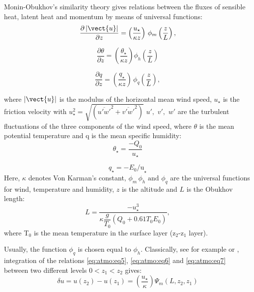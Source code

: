 Monin-Obukhov's similarity theory gives relations between the fluxes of
sensible heat, latent heat and momentum by means of universal functions:
\begin{equation}
\label{eq:atmo:eq5}
\frac{\partial \left| {\vect{u}} \right|}{\partial z} =
\left( {\frac{{u}_{{\star }} }{\kappa z}} \right) \, \phi_{m} \left(
{\dfrac{z}{L}} \right),
\end{equation}

\begin{equation}
\label{eq:atmo:eq6}
\frac{\partial {\theta }}{\partial z}=\left( {\frac{\theta_{\star}}{\kappa z}} \right)\phi_{h} \left({\frac{z}{L}} \right)
\end{equation}

\begin{equation}
\label{eq:atmo:eq7}
\frac{\partial q}{\partial z}=\left(
{\frac{q_{\star} }{\kappa z}} \right) \,
\phi_{q} \left(
{\frac{z}{L}} \right),
\end{equation}


where $\left| {\vect{u}} \right|$ is the modulus of the horizontal mean wind speed,
\newline
$u_\star $ is the friction velocity with $u_{\star}^{2} =\sqrt{(\overline{u'w'}^{2}+\overline{v'w'}^{2})}$
\newline
$u',\,\,v',\,\,w'$ are the turbulent fluctuations of the three components of the wind speed,
\newline
where $\theta$ is the mean potential temperature and q is the mean specific humidity:
\begin{equation}
\theta_{\star}=\frac{-Q_{0}}{u_{\star}}
\end{equation}

\begin{equation}
q_{\star} =-E_{0} \mbox{/u}_{\star}
\end{equation}
\newline
Here, $\kappa$ denotes Von Karman's constant, $\phi_{m} \, \phi_{h} \,\,\mbox{and}\,\,\phi_{q} $
are the universal functions for wind, temperature and humidity, $z$ is the
altitude and $L$ is the Obukhov length:
\begin{equation}
\label{eq:atmo:eq8}
L = \dfrac{-u_{\star}^{3}}{
  \kappa \dfrac{g}{T_{0}} \left( Q_{0}
  +0.61 T_{0} E_{0} \right)
},
\end{equation}
where T$_{0}$ is the mean temperature in the surface layer (z$_{2}$-z$_{1}$
layer).

Usually, the function $\phi_{q} $ is chosen equal to $\phi
_{h} $. Classically, see for example \cite{Garratt:1992} or \cite{Cheng:2005},
integration of the relations \eqref{eq:atmo:eq5}, \eqref{eq:atmo:eq6} and \eqref{eq:atmo:eq7}
between two different levels $0<z_{1} <z_{2} $ gives:
\begin{equation}
\label{eq:atmo:eq9}
\delta u=u(z_2)-u(z_1)=
\left(\frac {u_{\star}}{\kappa} \right)\Psi_{m}\left({L,z_2,z_1} \right)
\end{equation}


